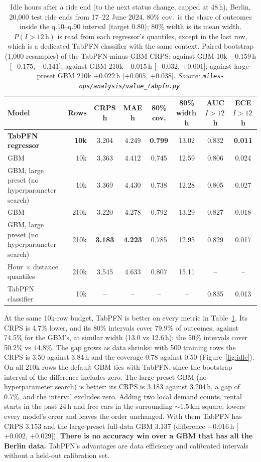 \documentclass[11pt,a4paper]{article}
\begin{document}
\begin{table}[h]
\centering\small
\caption{Idle hours after a ride end (to the next status change, capped at 48\,h), Berlin, 20{,}000 test ride ends from 17--22 June 2024. 80\% cov.\ is the share of outcomes inside the q.10--q.90 interval (target 0.80); 80\% width is its mean width. $P(I{>}12\,\mathrm{h})$ is read from each regressor's quantiles, except in the last row, which is a dedicated TabPFN classifier with the same context. Paired bootstrap (1{,}000 resamples) of the TabPFN-minus-GBM CRPS: against GBM 10k $-0.159$\,h [$-0.175$, $-0.141$]; against GBM 210k $-0.015$\,h [$-0.032$, $+0.001$]; against large-preset GBM 210k $+0.022$\,h [$+0.005$, $+0.038$]. \emph{Source: \texttt{miles-ops/analysis/value\_tabpfn.py}.}}
\label{tab:idle}
\setlength{\tabcolsep}{4pt}
\begin{tabular}{@{}>{\raggedright\arraybackslash}p{3.4cm}rcccccc@{}}
\toprule
Model & Rows & CRPS h & MAE h & 80\% cov. & 80\% width\,h & AUC $I{>}12$\,h & ECE $I{>}12$\,h \\
\midrule
\textbf{TabPFN regressor} & \textbf{10k} & 3.204 & 4.249 & \textbf{0.799} & 13.02 & 0.832 & \textbf{0.011} \\
GBM & 10k & 3.363 & 4.412 & 0.745 & 12.59 & 0.806 & 0.024 \\
GBM, large preset (no hyperparameter search) & 10k & 3.369 & 4.430 & 0.738 & 12.28 & 0.805 & 0.027 \\
GBM & 210k & 3.220 & 4.278 & 0.792 & 13.29 & 0.827 & 0.018 \\
GBM, large preset (no hyperparameter search) & 210k & \textbf{3.183} & \textbf{4.223} & 0.785 & 12.95 & 0.829 & 0.017 \\
Hour $\times$ distance quantiles & 210k & 3.545 & 4.633 & 0.807 & 15.11 & -- & -- \\
\midrule
TabPFN classifier & 10k & -- & -- & -- & -- & 0.835 & 0.013 \\
\bottomrule
\end{tabular}
\end{table}

At the same 10k-row budget, TabPFN is better on every metric in Table~\ref{tab:idle}. Its CRPS is 4.7\% lower, and its 80\% intervals cover 79.9\% of outcomes, against 74.5\% for the GBM's, at similar width (13.0 vs 12.6\,h); the 50\% intervals cover 50.2\% vs 44.8\%. The gap grows as data shrinks: with 500 training rows the CRPS is 3.50 against 3.84\,h and the coverage 0.78 against 0.50 (Figure~\ref{fig:idle}). On all 210k rows the default GBM ties with TabPFN, since the bootstrap interval of the difference includes zero. The large-preset GBM (no hyperparameter search) is better: its CRPS is 3.183 against 3.204\,h, a gap of 0.7\%, and the interval excludes zero. Adding two local demand counts, rental starts in the past 24\,h and free cars in the surrounding ${\sim}1.5$\,km square, lowers every model's error and leaves the order unchanged. With them TabPFN has CRPS 3.153 and the large-preset full-data GBM 3.137 (difference $+0.016$\,h [$+0.002$, $+0.029$]). \textbf{There is no accuracy win over a GBM that has all the Berlin data.} TabPFN's advantages are data efficiency and calibrated intervals without a held-out calibration set.
\end{document}
